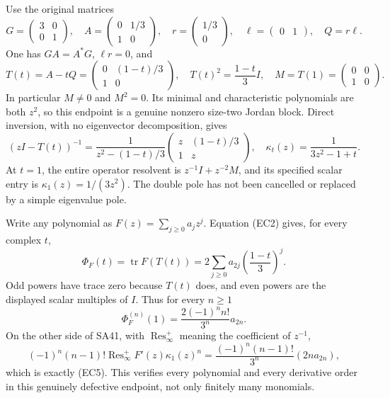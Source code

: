 \documentclass[11pt]{article}
\newcommand{\tr}{\operatorname{tr}}
\newcommand{\Res}{\operatorname{Res}}
\begin{document}
Use the original matrices
\begin{equation}
 G=\begin{pmatrix}3&0\\0&1\end{pmatrix},\quad
 A=\begin{pmatrix}0&1/3\\1&0\end{pmatrix},\quad
 r=\begin{pmatrix}1/3\\0\end{pmatrix},\quad
 \ell=\begin{pmatrix}0&1\end{pmatrix},\quad Q=r\ell.
 \tag{EC1}
\end{equation}
One has \(GA=A^*G\), \(\ell r=0\), and
\begin{equation}
 T(t)=A-tQ=\begin{pmatrix}0&(1-t)/3\\1&0\end{pmatrix},
 \quad T(t)^2=\frac{1-t}{3}I,\quad
 M=T(1)=\begin{pmatrix}0&0\\1&0\end{pmatrix}.
 \tag{EC2}
\end{equation}
In particular \(M\ne0\) and \(M^2=0\). Its minimal and
characteristic polynomials are both \(z^2\), so this endpoint is a
genuine nonzero size-two Jordan block.
Direct inversion, with no eigenvector decomposition, gives
\begin{equation}
 (zI-T(t))^{-1}
 =\frac1{z^2-(1-t)/3}
     \begin{pmatrix}z&(1-t)/3\\1&z\end{pmatrix},
 \quad
 \kappa_t(z)=\frac1{3z^2-1+t}.
 \tag{EC3}
\end{equation}
At \(t=1\), the entire operator resolvent is
\(z^{-1}I+z^{-2}M\), and its specified scalar entry is
\(\kappa_1(z)=1/(3z^2)\). The double pole has not been
cancelled or replaced by a simple eigenvalue pole.

Write any polynomial as \(F(z)=\sum_{j\ge0}a_jz^j\).
Equation (EC2) gives, for every complex \(t\),
\begin{equation}
 \Phi_F(t)=\tr F(T(t))
     =2\sum_{j\ge0}a_{2j}\left(\frac{1-t}{3}\right)^j .
 \tag{EC4}
\end{equation}
Odd powers have trace zero because \(T(t)\) does, and even
powers are the displayed scalar multiples of \(I\).
Thus for every \(n\ge1\)
\begin{equation}
 \Phi_F^{(n)}(1)=\frac{2(-1)^n n!}{3^n}a_{2n}.
 \tag{EC5}
\end{equation}
On the other side of SA41, with \(\Res_\infty^+\) meaning the
coefficient of \(z^{-1}\),
\[
 (-1)^n(n-1)!\Res_\infty^+F'(z)\kappa_1(z)^n
 =\frac{(-1)^n(n-1)!}{3^n}(2n a_{2n}),
\]
which is exactly (EC5). This verifies every polynomial and
every derivative order in this genuinely defective endpoint,
not only finitely many monomials.
\end{document}
